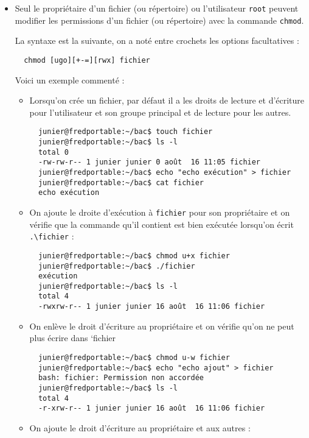 \documentclass[
  11pt,
]{article}
\newcounter{prop}
\begin{document}
\begin{itemize}
\item
  Seul le propriétaire d'un fichier (ou répertoire) ou l'utilisateur
  \texttt{root} peuvent modifier les permissions d'un fichier (ou
  répertoire) avec la commande \texttt{chmod}.

  La syntaxe est la suivante, on a noté entre crochets les options
  facultatives :

\begin{verbatim}
  chmod [ugo][+-=][rwx] fichier
\end{verbatim}

  Voici un exemple commenté :

  \begin{itemize}
  \item
    Lorsqu'on crée un fichier, par défaut il a les droits de lecture et
    d'écriture pour l'utilisateur et son groupe principal et de lecture
    pour les autres.

\begin{verbatim}
  junier@fredportable:~/bac$ touch fichier
  junier@fredportable:~/bac$ ls -l
  total 0
  -rw-rw-r-- 1 junier junier 0 août  16 11:05 fichier
  junier@fredportable:~/bac$ echo "echo exécution" > fichier
  junier@fredportable:~/bac$ cat fichier 
  echo exécution
\end{verbatim}
  \item
    On ajoute le droite d'exécution à \texttt{fichier} pour son
    propriétaire et on vérifie que la commande qu'il contient est bien
    exécutée lorsqu'on écrit \texttt{.\textbackslash{}fichier} :

\begin{verbatim}
  junier@fredportable:~/bac$ chmod u+x fichier
  junier@fredportable:~/bac$ ./fichier 
  exécution
  junier@fredportable:~/bac$ ls -l
  total 4
  -rwxrw-r-- 1 junier junier 16 août  16 11:06 fichier
\end{verbatim}
  \item
    On enlève le droit d'écriture au propriétaire et on vérifie qu'on ne
    peut plus écrire dans `fichier

\begin{verbatim}
  junier@fredportable:~/bac$ chmod u-w fichier 
  junier@fredportable:~/bac$ echo "echo ajout" > fichier
  bash: fichier: Permission non accordée
  junier@fredportable:~/bac$ ls -l
  total 4
  -r-xrw-r-- 1 junier junier 16 août  16 11:06 fichier
\end{verbatim}
  \item
    On ajoute le droit d'écriture au propriétaire et aux autres :


\end{itemize}
\end{itemize}
\end{document}
